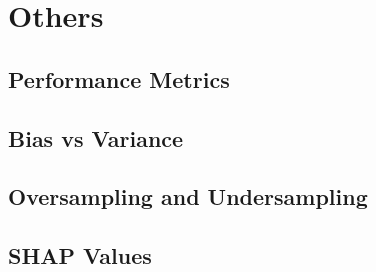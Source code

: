 \section{Others}

\subsection{Performance Metrics} 

\subsection{Bias vs Variance}

\subsection{Oversampling and Undersampling}

\subsection{SHAP Values}
